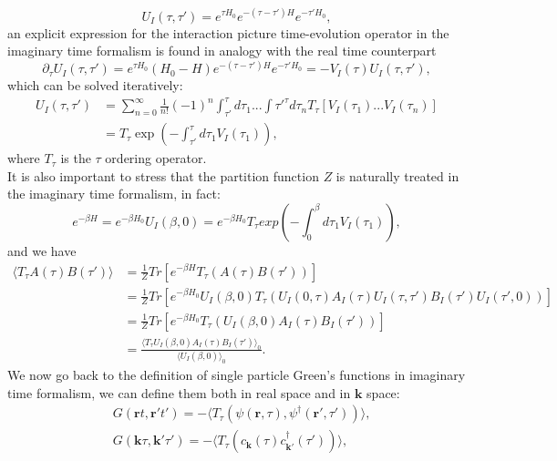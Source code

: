 \documentclass[12pt, a4paper]{report}
\numberwithin{equation}{section}
\begin{document}
\begin{equation}
    U_I(\tau,\tau')=e^{\tau H_0}e^{-(\tau-\tau')H}e^{-\tau'H_0},
\end{equation}
an explicit expression for the interaction picture time-evolution operator in the imaginary time formalism is found in analogy with 
the real time counterpart
\begin{equation}
    \partial_\tau U_I(\tau,\tau')=e^{\tau H_0}(H_0-H)e^{-(\tau-\tau')H}e^{-\tau'H_0}=-V_I(\tau)U_I(\tau,\tau'),
\end{equation}
which can be solved iteratively:
\begin{equation}
\begin{split}
    U_I(\tau,\tau')&=\sum_{n=0}^\infty\frac{1}{n!}(-1)^n\int_{\tau'}^{\tau}d\tau_1...\int{\tau'}^{\tau}d\tau_nT_\tau\left[V_I(\tau_1)...V_I(\tau_n)\right]\\
    &=T_\tau\exp{\left(-\int_{\tau'}^\tau d\tau_1V_I(\tau_1)\right)},
\end{split}
\end{equation}
where $T_\tau$ is the $\tau$ ordering operator.\\
It is also important to stress that the partition function $Z$ is naturally treated in the imaginary time formalism, in fact:
\begin{equation}
    e^{-\beta H}=e^{-\beta H_0}U_I(\beta,0)=e^{-\beta H_0}T_\tau exp{\left(-\int_{0}^{\beta}d\tau_1V_I(\tau_1)\right)},
\end{equation}
and we have
\begin{equation}
\begin{split}
    \langle T_\tau A(\tau)B(\tau')\rangle &= \frac{1}{Z}Tr\left[e^{-\beta H}T_\tau(A(\tau)B(\tau'))\right]\\
    &=\frac{1}{Z}Tr\left[e^{-\beta H_0}U_I(\beta,0)T_\tau(U_I(0,\tau)A_I(\tau)U_I(\tau,\tau')B_I(\tau')U_I(\tau',0)) \right]\\
    &=\frac{1}{Z}Tr\left[e^{-\beta H_0}T_\tau(U_I(\beta,0)A_I(\tau)B_I(\tau'))\right]\\
    &=\frac{\langle T_\tau U_I(\beta,0)A_I(\tau)B_I(\tau')\rangle_0}{\langle U_I(\beta,0)\rangle_0}.
\end{split}
\end{equation}
We now go back to the definition of single particle Green's functions in imaginary time formalism, we can define them both in real space 
and in $\mathbf{k}$ space:
\begin{equation}
\begin{split}
    &G(\mathbf{r}t,\mathbf{r}'t')=-\langle T_\tau\left(\psi(\mathbf{r},\tau),\psi^\dagger(\mathbf{r}',\tau')\right)\rangle,\\
    &G(\mathbf{k}\tau,\mathbf{k}'\tau')=-\langle T_\tau\left(c_{\mathbf{k}}(\tau)c^\dagger_{\mathbf{k}'}(\tau')\right)\rangle,
\end{split}
\end{equation}
\end{document}
